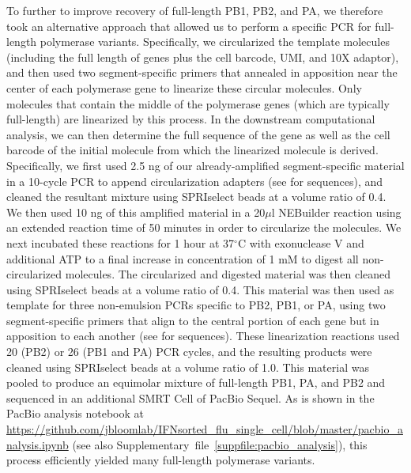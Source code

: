 \documentclass[9pt,lineno]{elife}
\begin{document}
To further to improve recovery of full-length PB1, PB2, and PA, we therefore took an alternative approach that allowed us to perform a specific PCR for full-length polymerase variants.
Specifically, we circularized the template molecules (including the full length of genes plus the cell barcode, UMI, and 10X adaptor), and then used two segment-specific primers that annealed in apposition near the center of each polymerase gene to linearize these circular molecules.
Only molecules that contain the middle of the polymerase genes (which are typically full-length) are linearized by this process.
In the downstream computational analysis, we can then determine the full sequence of the gene as well as the cell barcode of the initial molecule from which the linearized molecule is derived.
Specifically, we first used 2.5 ng of our already-amplified segment-specific material in a 10-cycle PCR to append circularization adapters (see  for sequences), and cleaned the resultant mixture using SPRIselect beads at a volume ratio of 0.4.
We then used 10 ng of this amplified material in a 20$\mu$l NEBuilder reaction using an extended reaction time of 50 minutes in order to circularize the molecules.
We next incubated these reactions for 1 hour at 37$^{\circ}$C with exonuclease V and additional ATP to a final increase in concentration of 1 mM to digest all non-circularized molecules.
The circularized and digested material was then cleaned using SPRIselect beads at a volume ratio of 0.4.
This material was then used as template for three non-emulsion PCRs specific to PB2, PB1, or PA, using two segment-specific primers that align to the central portion of each gene but in apposition to each another (see  for sequences).
These linearization reactions used 20 (PB2) or 26 (PB1 and PA) PCR cycles, and the resulting products were cleaned using SPRIselect beads at a volume ratio of 1.0.
This material was pooled to produce an equimolar mixture of full-length PB1, PA, and PB2 and sequenced in an additional SMRT Cell of PacBio Sequel. 
As is shown in the PacBio analysis notebook at \url{https://github.com/jbloomlab/IFNsorted_flu_single_cell/blob/master/pacbio_analysis.ipynb} (see also Supplementary~file~\ref{suppfile:pacbio_analysis}), this process efficiently yielded many full-length polymerase variants.
\end{document}
